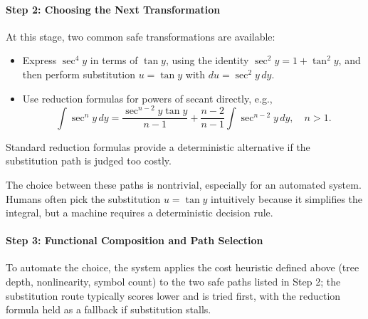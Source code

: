 \paragraph{Step 2: Choosing the Next Transformation}

At this stage, two common safe transformations are available:

\begin{itemize}
  \item Express \(\sec^4 y\) in terms of \(\tan y\), using the identity \(\sec^2 y = 1 + \tan^2 y\), and then perform substitution \(u = \tan y\) with \(du = \sec^2 y \, dy\).
  \item Use reduction formulas for powers of secant directly, e.g.,
  \begin{equation}
    \int \sec^{n} y \, dy = \frac{\sec^{n-2} y \tan y}{n-1} + \frac{n-2}{n-1} \int \sec^{n-2} y \, dy, \quad n > 1.
    \label{eq:secant_reduction_formula}
  \end{equation}
\end{itemize}
Standard reduction formulas provide a deterministic alternative if the substitution path is judged too costly.

The choice between these paths is nontrivial, especially for an automated system. Humans often pick the substitution \(u = \tan y\) intuitively because it simplifies the integral, but a machine requires a deterministic decision rule.

\paragraph{Step 3: Functional Composition and Path Selection}

To automate the choice, the system applies the cost heuristic defined above (tree depth, nonlinearity, symbol count) to the two safe paths listed in Step 2; the substitution route typically scores lower and is tried first, with the reduction formula held as a fallback if substitution stalls.

